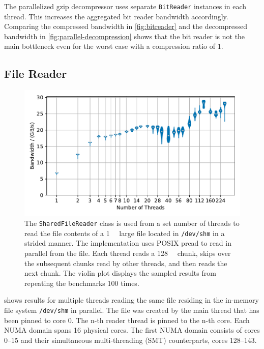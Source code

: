 The parallelized gzip decompressor uses separate \texttt{BitReader} instances in each thread.
This increases the aggregated bit reader bandwidth accordingly.
Comparing the compressed bandwidth in \cref{fig:bitreader} and the decompressed bandwidth in \cref{fig:parallel-decompression} shows that the bit reader is not the main bottleneck even for the worst case with a compression ratio of 1.


\subsection{File Reader}

\begin{figure}
    \centering
    \includegraphics[width=\linewidth]{plots/filereader-bandwidths-number-of-threads-sequential-pinning.pdf}
    \caption{
        The \texttt{SharedFileReader} class is used from a set number of threads to read the file contents of a \SI{1}{\gibi\byte} large file located in \texttt{/dev/shm} in a strided manner.
        The implementation uses POSIX pread to read in parallel from the file.
        Each thread reads a \SI{128}{\kibi\byte} chunk, skips over the subsequent chunks read by other threads, and then reads the next chunk.
        The violin plot displays the sampled results from repeating the benchmarks 100 times.
    }
    \label{fig:filereader}
\end{figure}

 shows results for multiple threads reading the same file residing in the in-memory file system \texttt{/dev/shm} in parallel.
The file was created by the main thread that has been pinned to core 0.
The n-th reader thread is pinned to the n-th core.
Each NUMA domain spans 16 physical cores.
The first NUMA domain consists of cores 0--15 and their simultaneous multi-threading (SMT) counterparts, cores 128--143.

